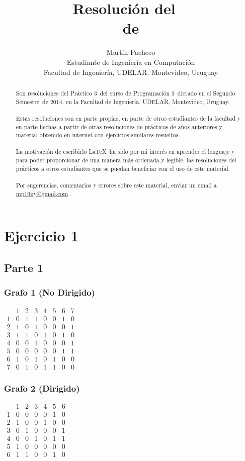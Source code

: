 \documentclass[letterpaper, fleqn]{report}
\title{Resolución del \practico\ \\de \materia}
\author{Martín Pacheco\\Estudiante de Ingeniería en Computación\\Facultad de Ingeniería, UDELAR, Montevideo, Uruguay}
\date{\anio}
\newcommand{\materia}{Programación 3}
\newcommand{\practico}{Práctico 3}
\newcommand{\facultad}{Facultad de Ingeniería}
\newcommand{\semestre}{Segundo Semestre}
\newcommand{\anio}{2014}
\begin{document}
\maketitle
\def\abstractname{ Sobre este documento...}
\begin{abstract}
  Son resoluciones del \practico\ del curso de \materia\ dictado en el \semestre\ de \anio, en la \facultad, UDELAR, Montevideo, Uruguay. 
  \\\\
  Estas resoluciones son en parte propias, en parte de otros estudiantes de la facultad y en parte hechas a partir de otras resoluciones de prácticos de años anteriores y material obtenido en internet con ejercicios similares resueltos.
  \\\\
  La motivación de escribirlo \LaTeX\ ha sido por mi interés en aprender el lenguaje y para poder proporcionar de una manera más ordenada y legible, las resoluciones del prácticos a otros estudiantes que se puedan beneficiar con el uso de este material.
  \\\\
  Por sugerencias, comentarios y errores sobre este material, enviar un email a \href{mailto:mp19uy@gmail.com}{mp19uy@gmail.com} .
\end{abstract}

\section*{Ejercicio 1}
\subsection*{Parte 1}
\subsubsection*{Grafo 1 (No Dirigido)}
$
\begin{array}{c|ccccccc}
  &1&2&3&4&5&6&7\\\hline
 1&0&1&1&0&0&1&0\\
 2&1&0&1&0&0&0&1\\
 3&1&1&0&1&0&1&0\\
 4&0&0&1&0&0&0&1\\
 5&0&0&0&0&0&1&1\\
 6&1&0&1&0&1&0&0\\
 7&0&1&0&1&1&0&0
\end{array}$

\subsubsection*{Grafo 2 (Dirigido)}
$\begin{array}{c|cccccc}
  &1&2&3&4&5&6\\\hline
 1&0&0&0&0&1&0\\
 2&1&0&0&1&0&0\\
 3&0&1&0&0&0&1\\
 4&0&0&1&0&1&1\\
 5&1&0&0&0&0&0\\
 6&1&1&0&0&1&0
\end{array}
$
\end{document}
